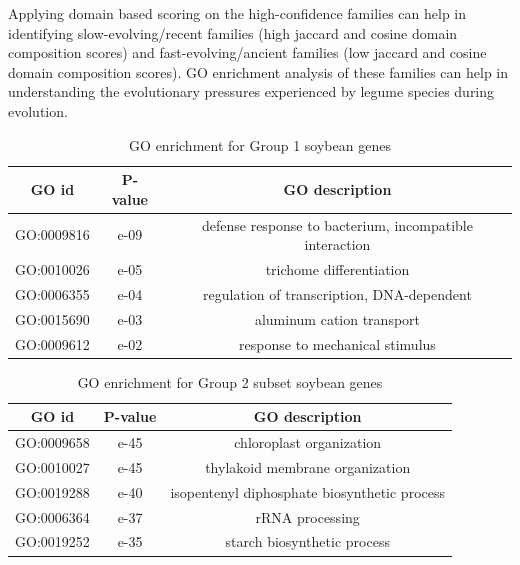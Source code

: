 \documentclass{article}
\begin{document}
		Applying domain based scoring on the high-confidence families can help in identifying slow-evolving/recent families (high jaccard and cosine domain composition scores) and fast-evolving/ancient families (low jaccard and cosine domain composition scores). GO enrichment analysis of these families can help in understanding the evolutionary pressures experienced by legume species during evolution.
		
		\begin{table}[h!]
			\centering
			\begin{tabular}{|c |c |c |} 
				\hline
				GO id & P-value & GO description \\
				\hline\hline
				GO:0009816 & e-09 & defense response to bacterium, incompatible interaction \\ 
				\hline
				GO:0010026 & e-05 & trichome differentiation \\
				\hline
				GO:0006355 & e-04 & regulation of transcription, DNA-dependent \\
				\hline
				GO:0015690 & e-03 & aluminum cation transport \\
				\hline
				GO:0009612 & e-02 & response to mechanical stimulus \\ 
				\hline
			\end{tabular}
			\caption{GO enrichment for Group 1 soybean genes}
			\label{tab:gotable_group1}
		\end{table}
		
		\begin{table}[h!]
			\centering
			\begin{tabular}{|c |c |c |} 
				\hline
				GO id & P-value & GO description \\
				\hline\hline
				GO:0009658 & e-45 & chloroplast organization \\ 
				\hline
				GO:0010027 & e-45 & thylakoid membrane organization \\
				\hline
				GO:0019288 & e-40 & isopentenyl diphosphate biosynthetic process \\
				\hline
				GO:0006364 & e-37 & rRNA processing \\
				\hline
				GO:0019252 & e-35 & starch biosynthetic process \\ 
				\hline
			\end{tabular}
			\caption{GO enrichment for Group 2 subset soybean genes}
			\label{tab:gotable_group2_subset}
		\end{table}
		
\end{document}
